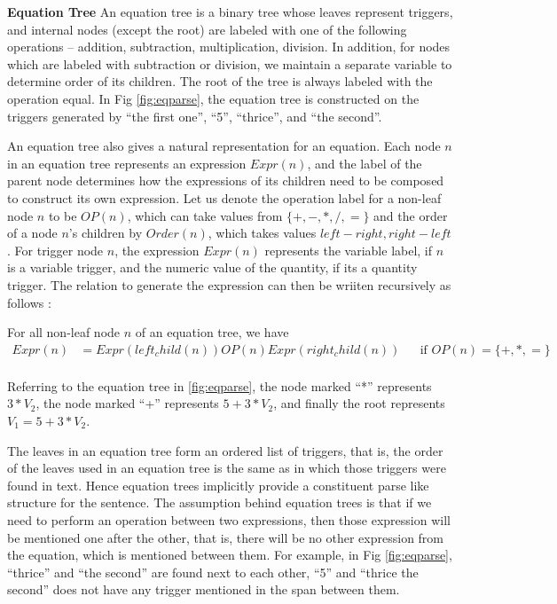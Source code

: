   \noindent \textbf{Equation Tree} An equation tree is a binary tree
  whose leaves represent triggers, and internal nodes (except the
  root) are labeled with one of the following operations -- addition,
  subtraction, multiplication, division. In addition, for nodes which
  are labeled with subtraction or division, we maintain a separate
  variable to determine order of its children. The root of the tree is
  always labeled with the operation equal. In Fig \ref{fig:eqparse},
  the equation tree is constructed on the triggers generated by ``the
  first one'', ``5'', ``thrice'', and ``the second''. 

  An equation tree also gives a natural representation for an
  equation. Each node $n$ in an equation tree represents an expression
  $Expr(n)$, and the label of the parent node determines how the
  expressions of its children need to be composed to construct its own
  expression. Let us denote the operation label for a non-leaf node
  $n$ to be $OP(n)$, which can take values from $\{+, -, *, /, =\}$
  and the order of a node $n$'s children by $Order(n)$, which takes
  values ${left-right, right-left}$. For trigger node $n$, the
  expression $Expr(n)$ represents the variable label, if $n$ is a
  variable trigger, and the numeric value of the quantity, if its a
  quantity trigger. The relation to generate the expression can then
  be wriiten recursively as follows :
  
  For all non-leaf node $n$ of an equation tree, we have
  \begin{align*}
     Expr(n) &= Expr(left_child(n)) OP(n) Expr(right_child(n)) & &
     \text{if } OP(n) = \{+,*,=\} \\
  \end{align*}  


  Referring to the equation tree in \ref{fig:eqparse}, the node marked
  ``*'' represents $3*V_2$, the node marked ``+'' represents
  $5+3*V_2$, and finally the root represents $V_1=5+3*V_2$.
  
  The leaves in an equation tree form an ordered list of triggers,
  that is, the order of the leaves used in an equation tree is the
  same as in which those triggers were found in text. Hence equation
  trees implicitly provide a constituent parse like structure for the
  sentence. The assumption behind equation trees is that if we need to
  perform an operation between two expressions, then those expression
  will be mentioned one after the other, that is, there will be no
  other expression from the equation, which is mentioned between
  them. For example, in Fig \ref{fig:eqparse}, ``thrice'' and ``the
  second'' are found next to each other, ``5'' and ``thrice the
  second'' does not have any trigger mentioned in the span between
  them. 

